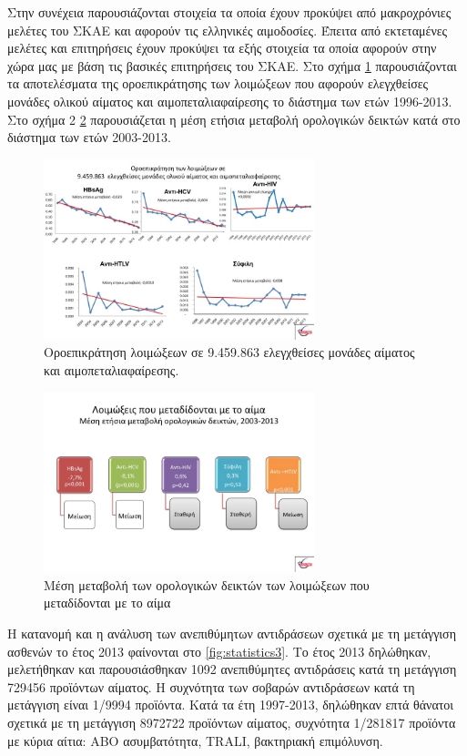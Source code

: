 	Στην συνέχεια παρουσιάζονται στοιχεία τα οποία έχουν προκύψει από μακροχρόνιες μελέτες του ΣΚΑΕ και αφορούν τις ελληνικές αιμοδοσίες. \cite{ΚΕΕΛΠΝΟ2015}
	Έπειτα από εκτεταμένες μελέτες και επιτηρήσεις έχουν προκύψει τα εξής στοιχεία τα οποία αφορούν στην χώρα μας με βάση τις βασικές επιτηρήσεις του ΣΚΑΕ. Στο σχήμα \ref{fig:statistics1}  παρουσιάζονται τα αποτελέσματα της οροεπικράτησης των λοιμώξεων που αφορούν ελεγχθείσες μονάδες ολικού αίματος και αιμοπεταλιαφαίρεσης το διάστημα των ετών 1996-2013. Στο σχήμα 2 \ref{fig:statistics2} παρουσιάζεται η μέση ετήσια μεταβολή ορολογικών δεικτών κατά στο διάστημα των ετών 2003-2013.
	\begin{figure}[h!]
	    \centering
	    \includegraphics[width=0.7\textwidth]{statistics1.jpg}
	    \caption{Οροεπικράτηση λοιμώξεων σε 9.459.863 ελεγχθείσες μονάδες αίματος και αιμοπεταλιαφαίρεσης.}
	    \label{fig:statistics1}
\end{figure}	
\begin{figure}[h!]
	    \centering
	    \includegraphics[width=0.7\textwidth]{statistics2.jpg}
	    \caption{Μέση μεταβολή των ορολογικών δεικτών των λοιμώξεων που μεταδίδονται με το αίμα}
	    \label{fig:statistics2}
\end{figure}	
	Η κατανομή και η ανάλυση των ανεπιθύμητων αντιδράσεων σχετικά με τη μετάγγιση ασθενών το έτος 2013 φαίνονται στο \ref{fig:statistics3}. Το έτος 2013 δηλώθηκαν, μελετήθηκαν και παρουσιάσθηκαν 1092 ανεπιθύμητες αντιδράσεις κατά τη μετάγγιση 729456 προϊόντων αίματος. Η συχνότητα των σοβαρών αντιδράσεων κατά τη μετάγγιση είναι 1/9994 προϊόντα. Κατά τα έτη 1997-2013, δηλώθηκαν επτά θάνατοι σχετικά με τη μετάγγιση 8972722 προϊόντων αίματος, συχνότητα 1/281817 προϊόντα με κύρια αίτια: ΑΒΟ ασυμβατότητα, TRALI, βακτηριακή επιμόλυνση.
